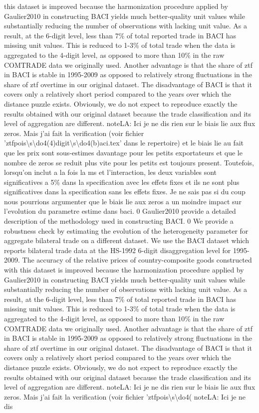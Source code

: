\documentclass[12pt,twoside,a4paper,notitlepage]{article}
\begin{document}
this dataset is improved because the harmonization procedure applied by Gaulier2010 in constructing BACI yields much better-quality unit values while substantially reducing the number of observations with lacking unit value. As a result, at the 6-digit level, less than 7\% of total reported trade in BACI has missing unit values. This is reduced to 1-3\% of total trade when the data is aggregated to the 4-digit level, as opposed to more than 10\% in the raw COMTRADE data we originally used. Another advantage is that the share of ztf in BACI is stable in 1995-2009 as opposed to relatively strong fluctuations in the share of ztf overtime in our original dataset. The disadvantage of BACI is that it covers only a relatively short period compared to the years over which the distance puzzle exists. Obviously, we do not expect to reproduce exactly the results obtained with our original dataset because the trade classification and its level of aggregation are different. noteLA: Ici je ne dis rien sur le biais lie aux flux zeros. Mais j'ai fait la verification (voir fichier 'ztfpois\textbackslash s\textbackslash do4(4)digit\textbackslash s\textbackslash do4(b)aci.tex' dans le repertoire) et le biais lie au fait que les prix sont sous-estimes davantage pour les petits exportateurs et que le nombre de zeros se reduit plus vite pour les petits est toujours present. Toutefois, lorsqu'on inclut a la fois la ms et l'interaction, les deux variables sont significatives a 5\% dans la specification avec les effets fixes et ils ne sont plus significatives dans la specification sans les effets fixes. Je ne sais pas si du coup nous pourrions argumenter que le biais lie aux zeros a un moindre impact sur l'evolution du parametre estime dans baci. 0 Gaulier2010 provide a detailed description of the methodology used in constructing BACI. 0 We provide a robustness check by estimating the evolution of the heterogeneity parameter for aggregate bilateral trade on a different dataset. We use the BACI dataset which reports bilateral trade data at the HS-1992 6-digit disaggregation level for 1995-2009. The accuracy of the relative prices of country-composite goods constructed with this dataset is improved because the harmonization procedure applied by Gaulier2010 in constructing BACI yields much better-quality unit values while substantially reducing the number of observations with lacking unit value. As a result, at the 6-digit level, less than 7\% of total reported trade in BACI has missing unit values. This is reduced to 1-3\% of total trade when the data is aggregated to the 4-digit level, as opposed to more than 10\% in the raw COMTRADE data we originally used. Another advantage is that the share of ztf in BACI is stable in 1995-2009 as opposed to relatively strong fluctuations in the share of ztf overtime in our original dataset. The disadvantage of BACI is that it covers only a relatively short period compared to the years over which the distance puzzle exists. Obviously, we do not expect to reproduce exactly the results obtained with our original dataset because the trade classification and its level of aggregation are different. noteLA: Ici je ne dis rien sur le biais lie aux flux zeros. Mais j'ai fait la verification (voir fichier 'ztfpois\textbackslash s\textbackslash do4( noteLA: Ici je ne dis 
\end{document}
